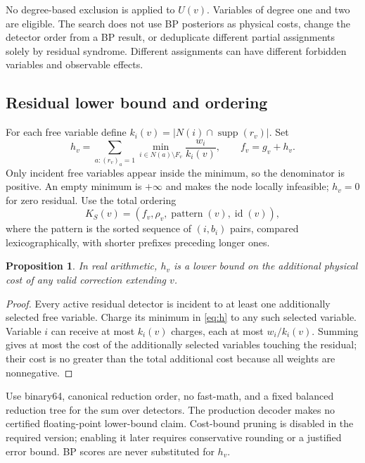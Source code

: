 \documentclass[11pt,a4paper]{article}
\newcommand{\id}{\operatorname{id}}
\newtheorem{proposition}{Proposition}
\begin{document}
No degree-based exclusion is applied to $U(v)$. Variables of degree one and two are eligible. The search does not use BP posteriors as physical costs, change the detector order from a BP result, or deduplicate different partial assignments solely by residual syndrome. Different assignments can have different forbidden variables and observable effects.

\subsection{Residual lower bound and ordering}
For each free variable define $k_i(v)=|N(i)\cap\operatorname{supp}(r_v)|$. Set
\begin{equation}\label{eq:h}
 h_v=\sum_{a:(r_v)_a=1}
 \min_{i\in N(a)\setminus F_v}\frac{w_i}{k_i(v)},\qquad f_v=g_v+h_v.
\end{equation}
Only incident free variables appear inside the minimum, so the denominator is positive. An empty minimum is $+\infty$ and makes the node locally infeasible; $h_v=0$ for zero residual. Use the total ordering
\begin{equation}\label{eq:searchrank}
 K_S(v)=(f_v,\rho_v,\operatorname{pattern}(v),\id(v)),
\end{equation}
where the pattern is the sorted sequence of $(i,b_i)$ pairs, compared lexicographically, with shorter prefixes preceding longer ones.

\begin{proposition}
In real arithmetic, $h_v$ is a lower bound on the additional physical cost of any valid correction extending $v$.
\end{proposition}
\begin{proof}
Every active residual detector is incident to at least one additionally selected free variable. Charge its minimum in \eqref{eq:h} to any such selected variable. Variable $i$ can receive at most $k_i(v)$ charges, each at most $w_i/k_i(v)$. Summing gives at most the cost of the additionally selected variables touching the residual; their cost is no greater than the total additional cost because all weights are nonnegative.
\end{proof}

Use binary64, canonical reduction order, no fast-math, and a fixed balanced reduction tree for the sum over detectors. The production decoder makes no certified floating-point lower-bound claim. Cost-bound pruning is disabled in the required version; enabling it later requires conservative rounding or a justified error bound. BP scores are never substituted for $h_v$.
\end{document}
